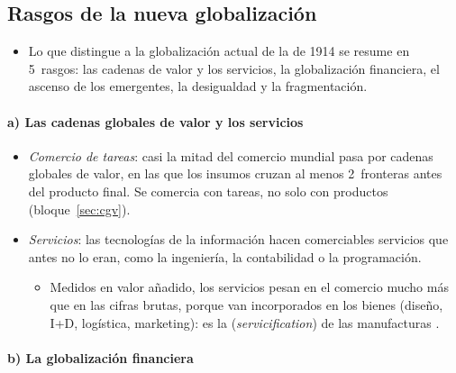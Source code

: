 \documentclass[11pt]{article}
\begin{document}
\subsection{Rasgos de la nueva globalización}\label{sec:rasgos}

\begin{itemize}
\item Lo que distingue a la globalización actual de la de 1914 se resume en 5~rasgos: las cadenas de valor y los servicios, la globalización financiera, el ascenso de los emergentes, la desigualdad y la fragmentación.
\end{itemize}

\paragraph{a) Las cadenas globales de valor y los servicios}

\begin{itemize}
\item \emph{Comercio de tareas}: casi la mitad del comercio mundial pasa por cadenas globales de valor, en las que los insumos cruzan al menos 2~fronteras antes del producto final\nocite{BM2020WDR}. Se comercia con tareas, no solo con productos (bloque~\ref{sec:cgv}).
\item \emph{Servicios}: las tecnologías de la información hacen comerciables servicios que antes no lo eran, como la ingeniería, la contabilidad o la programación.
  \begin{itemize}
  \item Medidos en valor añadido, los servicios pesan en el comercio mucho más que en las cifras brutas, porque van incorporados en los bienes (diseño, I+D, logística, marketing): es la  (\emph{servicification}) de las manufacturas\nocite{OCDE2023TiVA} .
  \end{itemize}
\end{itemize}

\paragraph{b) La globalización financiera}
\end{document}
